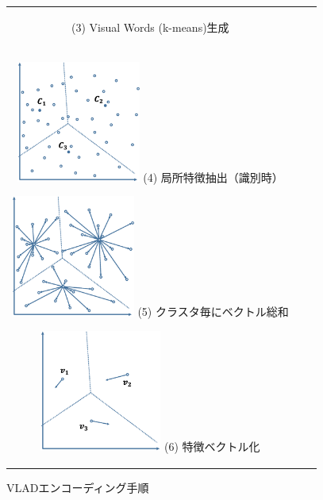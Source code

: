 \begin{figure}[htbp]
\begin{tabular}{ccc}
\begin{minipage}{0.33\textwidth}
\begin{center}
   \hspace{1.6cm} (3) Visual Words (k-means)生成
  \end{center}
 \end{minipage} \\
%
 \begin{minipage}{0.33\textwidth}
  \begin{center}
   \includegraphics[height=40mm]{figure/vlad_4.eps}
   \hspace{1.6cm} (4) 局所特徴抽出（識別時）
  \end{center}
 \end{minipage}
%
 \begin{minipage}{0.33\textwidth}
  \begin{center}
   \includegraphics[height=40mm]{figure/vlad_5.eps}
   \hspace{1.6cm} (5) クラスタ毎にベクトル総和
  \end{center}
 \end{minipage}
%
 \begin{minipage}{0.33\textwidth}
  \begin{center}
   \includegraphics[height=40mm]{figure/vlad_6.eps}
   \hspace{1.6cm} (6) 特徴ベクトル化
  \end{center}
 \end{minipage}
%
\end{tabular}
\caption{VLADエンコーディング手順}
\label{fig:vlad_encoding}
\end{figure}

